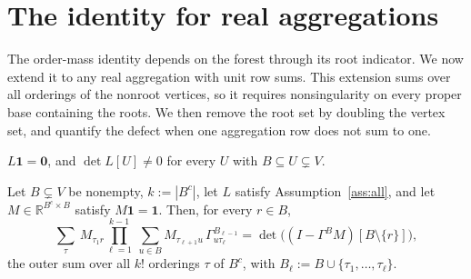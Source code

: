 \documentclass[onefignum,onetabnum]{siamart250211}
\numberwithin{theorem}{section}
\numberwithin{equation}{section}
\newcommand{\R}{\mathbb{R}}
\newcommand{\one}{\mathbf{1}}
\newcommand{\zero}{\mathbf{0}}
\begin{document}
\section{The identity for real aggregations}\label{sec:sm-algebra}

The order-mass identity depends on the forest through its root
indicator. We now extend it to any real aggregation with unit row
sums. This extension sums over all orderings of the nonroot vertices,
so it requires nonsingularity on every proper base containing the
roots. We then remove the root set by doubling the vertex set, and
quantify the defect when one aggregation row does not sum to one.

\begin{assumption}\label{ass:all}
$L\one=\zero$, and $\det L[U]\ne0$ for every $U$ with
$B\subseteq U\subsetneq V$.
\end{assumption}

\begin{corollary}\label{cor:soft}
Let $B\subsetneq V$ be nonempty, $k:=|B^c|$, let $L$ satisfy
Assumption~\ref{ass:all}, and let $M\in\R^{B^c\times B}$ satisfy $M\one=\one$.
Then, for every $r\in B$,
\begin{equation}\label{eq:soft}
\sum_{\tau}\ M_{\tau_1 r}\prod_{\ell=1}^{k-1}\
\sum_{u\in B}M_{\tau_{\ell+1}u}\,\Gamma^{B_{\ell-1}}_{u\tau_\ell}
=\det\big((I-\Gamma^BM)[B\setminus\{r\}]\big),
\end{equation}
the outer sum over all $k!$ orderings $\tau$ of $B^c$, with
$B_\ell:=B\cup\{\tau_1,\dots,\tau_\ell\}$.
\end{corollary}
\end{document}
